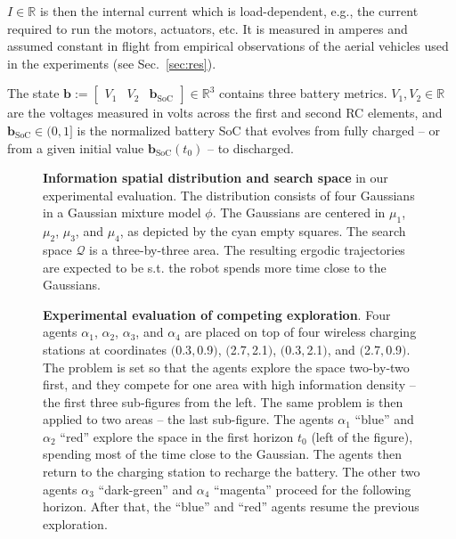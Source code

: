 \documentclass[letterpaper,10pt,conference,twoside]{IEEEtran}
\theoremstyle{definition}
\begin{document}
$I\in\mathbb{R}$ is then the internal current which is load-dependent, e.g., the current required to run the motors, actuators, etc. It is measured in amperes and assumed constant in flight from empirical observations of the aerial vehicles used in the experiments (see Sec.~\ref{sec:res}).

The state $\mathbf{b}:=\begin{bmatrix}V_1&V_2&\mathbf{b}_{\text{SoC}}\end{bmatrix}\in\mathbb{R}^3$ contains three battery metrics. $V_1,V_2\in\mathbb{R}$ are the voltages measured in volts across the first and second RC elements, and $\mathbf{b}_{\text{SoC}}\in(0,1]$ is the normalized battery SoC that evolves from fully charged -- or from a given initial value $\mathbf{b}_{\text{SoC}}(t_0)$ -- to discharged.



\begin{figure}[t!]
  \begin{minipage}[t!]{.5\columnwidth}
    \vspace*{-.2cm}
    
  \end{minipage}
  \begin{minipage}[c]{.48\columnwidth}
    \vspace*{.05cm}
    \caption{\textbf{Information spatial distribution and search space} in our experimental evaluation. The distribution consists of four Gaussians in a Gaussian mixture model $\phi$. The Gaussians are centered in $\mu_1$, $\mu_2$, $\mu_3$, and $\mu_4$, as depicted by the cyan empty squares. The search space $\mathcal{Q}$ is a three-by-three area. The resulting ergodic trajectories are expected to be s.t. the robot spends more time close to the Gaussians.}
    \label{fig:scenario}
  \end{minipage}
  \vspace*{-.15cm}
\end{figure}

\begin{figure*}[b!]
  \vspace*{-.2cm}
  
  \caption{\textbf{Experimental evaluation of %
  competing exploration}. Four agents $\alpha_1$, $\alpha_2$, $\alpha_3$, and $\alpha_4$ are placed on top of four wireless charging stations at coordinates $($0.3$,$0.9$)$, $($2.7$,$2.1$)$, $($0.3$,$2.1$)$, and $($2.7$,$0.9$)$. The problem is set so that the agents explore the space two-by-two first, and they compete for one area with high information density -- the first three sub-figures from the left. The same problem is then applied to two areas -- the last sub-figure. The agents $\alpha_1$ ``blue'' and $\alpha_2$ ``red'' explore the space in the first horizon $t_0$ (left of the figure), spending most of the time close to the Gaussian. The agents then return to the charging station to recharge the battery. The other two agents $\alpha_3$ ``dark-green'' and $\alpha_4$ ``magenta'' proceed for the following horizon. After that, the ``blue'' and ``red'' agents resume the previous exploration.}
  \label{fig:res2}
\end{figure*}
\end{document}
